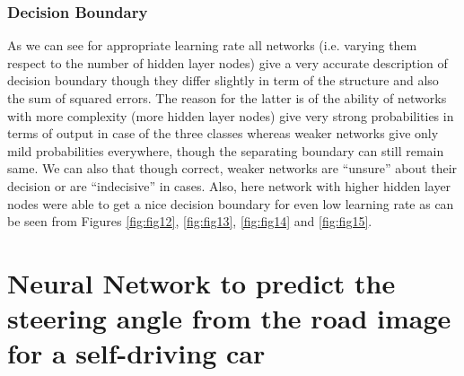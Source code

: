 \documentclass{article}
\begin{document}
\subsubsection{Decision Boundary}
As we can see for appropriate learning rate all networks (i.e. varying them respect to the number of hidden layer nodes) give a very accurate description of decision boundary though they differ slightly in term of the structure and also the sum of squared errors. The reason for the latter is of the ability of networks with more complexity (more hidden layer nodes) give very strong probabilities in terms of output in case of the three classes whereas weaker networks give only mild probabilities everywhere, though the separating boundary can still remain same. We can also that though correct, weaker networks are ``unsure'' about their decision or are ``indecisive'' in cases. Also, here network with higher hidden layer nodes were able to get a nice decision boundary for even low learning rate as can be seen from Figures \ref{fig:fig12}, \ref{fig:fig13}, \ref{fig:fig14} and \ref{fig:fig15}. 

\section{Neural Network to predict the steering angle from the road image for a self-driving car}
\end{document}
